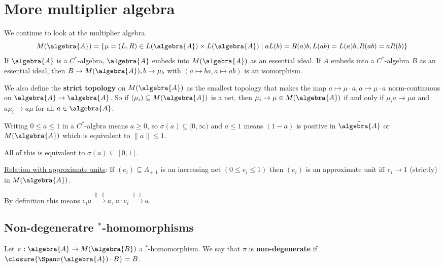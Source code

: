 \documentclass[a4paper]{article}
\begin{document}
\section{More multiplier algebra}

We continue to look at the multiplier algebra. 
\begin{equation*}
	M(\algebra{A}) = \{ \mu = (L,R) \in L(\algebra{A}) \times L(\algebra{A}) \mid a L(b) = R(a) b, L(ab) = L(a)b, R(ab) = a R(b)\}
\end{equation*}
If $\algebra{A}$ is a $C^*$-algebra, $\algebra{A}$ embeds into $M(\algebra{A})$ as an essential ideal.
If $A$ embeds into a $C^*$-algebra $B$ as an essential ideal, then $B \to M(\algebra{A}), b \to \mu_b$ with $(a \mapsto ba, a \mapsto ab)$ is an isomorphism.

We also define the \textbf{strict topology} on $M(\algebra{A})$ as the smallest topology that makes the map $a \mapsto \mu \cdot a, a \mapsto \mu \cdot a$ norm-continuous on $\algebra{A} \to \algebra{A}$.
So if $(\mu_i) \subseteq M(\algebra{A})$ is a net, then $\mu_i \to \mu \in M(\algebra{A})$ if and only if $\mu_i a \to \mu a$ and $a \mu_i \to a \mu$ for all $a \in \algebra{A}$.

\begin{remark}
	Writing $0 \leq a \leq 1$ in a $C^*$-algbra means $a \geq 0$, so $\sigma(a) \subseteq [0, \infty)$ and $a \leq 1$ means $(1 - a)$ is positive in $\tilde{\algebra{A}}$ or $M(\algebra{A})$ which is equivalent to $\|a\| \leq 1$.

	All of this is equivalent to $\sigma(a) \subseteq [0,1]$.
\end{remark}

\underline{Relation with approximate units}: If $(e_i) \subseteq A_{+, 1}$ is an increasing net $(0 \leq e_i \leq 1)$ then $(e_i)$ is an approximate unit iff $e_i \to 1$ (strictly) in $M(\algebra{A})$.

By definition this means $e_i a \xrightarrow{\|\cdot\|} a$, $a \cdot e_i \xrightarrow{\|\cdot\|} a$.

\subsection{Non-degeneratre $^*$-homomorphisms}

\begin{definition}
	Let $\pi: \algebra{A} \to M(\algebra{B})$ a $^*$-homomorphism. We say that $\pi$ is \textbf{non-degenerate} if $\closure{\Span \pi(\algebra{A}) \cdot B} = B$.
\end{definition}
\end{document}
